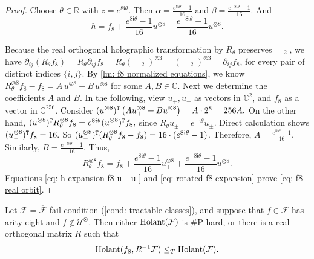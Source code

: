 \begin{proof}
Choose $\theta\in\mathbb R$ with $z=e^{8\mathfrak i\theta}$.
Then $\alpha=\frac{e^{8 \mathfrak i\theta}-1}{16}$ and $\beta=\frac{e^{-8 \mathfrak i\theta}-1}{16}$.
And
\begin{equation}
 h= f_8+\frac{e^{8 \mathfrak i\theta}-1}{16}u_+^{\otimes8}+\frac{e^{-8 \mathfrak i\theta}-1}{16} u_-^{\otimes8}.
 \label{eq: h expansion f8 u+ u-}
\end{equation}

Because the real orthogonal holographic transformation by $R_\theta$ preserves $=_2$, we have $\partial_{ij}(R_\theta f_8)=R_\theta\partial_{ij}f_8=R_\theta(=_2)^{\otimes 3}=(=_2)^{\otimes 3}=\partial_{ij}f_8$, for every pair of distinct indices $\{i,j\}.$ 
By \cref{lm: f8 normalized equations}, 
we know
\(R_\theta^{\otimes 8}f_8-f_8
=
A\,u_+^{\otimes 8}+B\,u_-^{\otimes 8}\) for some $A,B\in \mathbb C.$
Next we determine the coefficients $A$ and $B.$
In the following, view $u_+,u_-$ as vectors in $\mathbb C^2$, and $f_8$ as a vector in $\mathbb C^{256}.$
Consider \((u_-^{\otimes8})^{\tt T}\left(Au_+^{\otimes8}+Bu_-^{\otimes8}\right)=A\cdot 2^8=256A.\)
On the other hand, \((u_-^{\otimes8})^{\tt T}R_\theta^{\otimes8}f_8=e^{8i\theta}(u_-^{\otimes8})^{\tt T}f_8,\)
since $R_\theta u_\pm=e^{\pm\mathfrak i\theta}u_\pm$.
Direct calculation shows \((u_-^{\otimes8})^{\tt T}f_8=16.\)
So $(u_-^{\otimes 8})^{\tt T}(R_\theta^{\otimes 8}f_8-f_8)=16\cdot (e^{8 \mathfrak i\theta}-1)$.
Therefore, $A=\frac{e^{8\mathfrak i \theta}-1}{16}$.
Similarly, $B=\frac{e^{-8\mathfrak i \theta}-1}{16}$. 
Thus,
\begin{equation}
 R_\theta^{\otimes8}f_8
 =f_8+\frac{e^{8\mathfrak i\theta}-1}{16}u_+^{\otimes8}
      +\frac{e^{-8\mathfrak i\theta}-1}{16}u_-^{\otimes8}.
 \label{eq: rotated f8 expansion}
\end{equation}
Equations \eqref{eq: h expansion f8 u+ u-} and
\eqref{eq: rotated f8 expansion} prove \eqref{eq: f8 real orbit}.
\end{proof}

\begin{theorem}[Realization of $f_8$]
\label{thm: realize f8}
Let $\mathcal F=\overline{\mathcal F}$ fail condition
\rm{(\ref{cond: tractable classes})}, and suppose that
$f\in\mathcal F$ has arity eight and
$f\notin\mathcal U^{\otimes}$.  Then either
$\operatorname{Holant}(\mathcal F)$ is \#P-hard, or there is a real orthogonal matrix $R$ such that
\begin{equation}
 \operatorname{Holant}(f_8,R^{-1}\mathcal F)\leq_T\operatorname{Holant}(\mathcal F).
 \label{eq: realize f8 reduction}
\end{equation}
\end{theorem}

